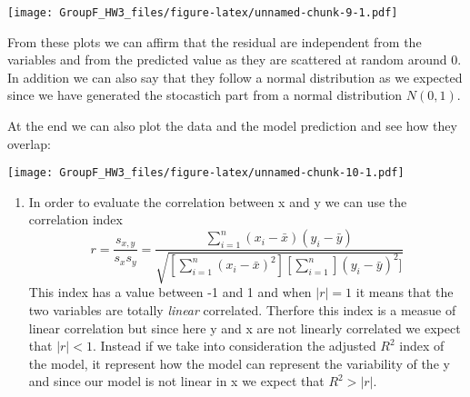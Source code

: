 \documentclass[
]{article}
\newenvironment{Shaded}{\begin{snugshade}}{\end{snugshade}}
\newcommand{\AttributeTok}[1]{\textcolor[rgb]{0.77,0.63,0.00}{#1}}
\newcommand{\CommentTok}[1]{\textcolor[rgb]{0.56,0.35,0.01}{\textit{#1}}}
\newcommand{\ControlFlowTok}[1]{\textcolor[rgb]{0.13,0.29,0.53}{\textbf{#1}}}
\newcommand{\DecValTok}[1]{\textcolor[rgb]{0.00,0.00,0.81}{#1}}
\newcommand{\FunctionTok}[1]{\textcolor[rgb]{0.00,0.00,0.00}{#1}}
\newcommand{\NormalTok}[1]{#1}
\newcommand{\OtherTok}[1]{\textcolor[rgb]{0.56,0.35,0.01}{#1}}
\newcommand{\SpecialCharTok}[1]{\textcolor[rgb]{0.00,0.00,0.00}{#1}}
\newcommand{\StringTok}[1]{\textcolor[rgb]{0.31,0.60,0.02}{#1}}
\providecommand{\tightlist}{%
  \setlength{\itemsep}{0pt}\setlength{\parskip}{0pt}}
\begin{document}
\texttt{[image: GroupF\_HW3\_files/figure-latex/unnamed-chunk-9-1.pdf]}

From these plots we can affirm that the residual are independent from
the variables and from the predicted value as they are scattered at
random around 0. In addition we can also say that they follow a normal
distribution as we expected since we have generated the stocastich part
from a normal distribution \(N(0,1)\).

At the end we can also plot the data and the model prediction and see
how they overlap:

\begin{Shaded}
\end{Shaded}

\texttt{[image: GroupF\_HW3\_files/figure-latex/unnamed-chunk-10-1.pdf]}

\begin{enumerate}
\def\labelenumi{\alph{enumi})}
\setcounter{enumi}{1}
\tightlist
\item
  In order to evaluate the correlation between x and y we can use the
  correlation index \[
  r=\frac{s_{x,y}}{s_xs_y}=\frac{\sum_{i=1}^n(x_i-\bar{x})(y_i-\bar{y})}{\sqrt{[\sum_{i=1}^n(x_i-\bar{x})^2][\sum_{i=1}^n](y_i-\bar{y})^2]}}
  \] This index has a value between -1 and 1 and when \(|r|=1\) it means
  that the two variables are totally \emph{linear} correlated. Therfore
  this index is a measue of linear correlation but since here y and x
  are not linearly correlated we expect that \(|r|<1\). Instead if we
  take into consideration the adjusted \(R^2\) index of the model, it
  represent how the model can represent the variability of the y and
  since our model is not linear in x we expect that \(R^2>|r|\).
\end{enumerate}
\end{document}
